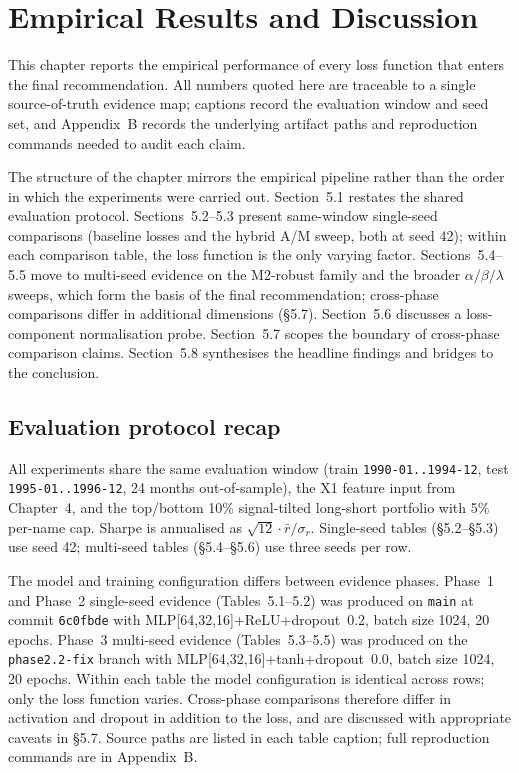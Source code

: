 \chapter{Empirical Results and Discussion}

\label{ch:empirical-results-and-discussion}

This chapter reports the empirical performance of every loss function that enters the final recommendation. All numbers quoted here are traceable to a single source-of-truth evidence map; captions record the evaluation window and seed set, and Appendix~B records the underlying artifact paths and reproduction commands needed to audit each claim.

The structure of the chapter mirrors the empirical pipeline rather than the order in which the experiments were carried out. Section~5.1 restates the shared evaluation protocol. Sections~5.2--5.3 present same-window single-seed comparisons (baseline losses and the hybrid A/M sweep, both at seed 42); within each comparison table, the loss function is the only varying factor. Sections~5.4--5.5 move to multi-seed evidence on the M2-robust family and the broader $\alpha/\beta/\lambda$ sweeps, which form the basis of the final recommendation; cross-phase comparisons differ in additional dimensions (\S5.7). Section~5.6 discusses a loss-component normalisation probe. Section~5.7 scopes the boundary of cross-phase comparison claims. Section~5.8 synthesises the headline findings and bridges to the conclusion.

\section{Evaluation protocol recap}

\label{sec:evaluation-protocol-recap}

All experiments share the same evaluation window (train \texttt{1990-01..1994-12}, test \texttt{1995-01..1996-12}, 24 months out-of-sample), the X1 feature input from Chapter~4, and the top/bottom 10\% signal-tilted long-short portfolio with 5\% per-name cap. Sharpe is annualised as $\sqrt{12} \cdot \bar r / \sigma_r$. Single-seed tables (\S5.2--\S5.3) use seed 42; multi-seed tables (\S5.4--\S5.6) use three seeds per row.

The model and training configuration differs between evidence phases. Phase~1 and Phase~2 single-seed evidence (Tables~5.1--5.2) was produced on \texttt{main} at commit \texttt{6c0fbde} with MLP[64,32,16]+ReLU+dropout~0.2, batch size 1024, 20 epochs. Phase~3 multi-seed evidence (Tables~5.3--5.5) was produced on the \texttt{phase2.2-fix} branch with MLP[64,32,16]+tanh+dropout~0.0, batch size 1024, 20 epochs. Within each table the model configuration is identical across rows; only the loss function varies. Cross-phase comparisons therefore differ in activation and dropout in addition to the loss, and are discussed with appropriate caveats in \S5.7. Source paths are listed in each table caption; full reproduction commands are in Appendix~B.

